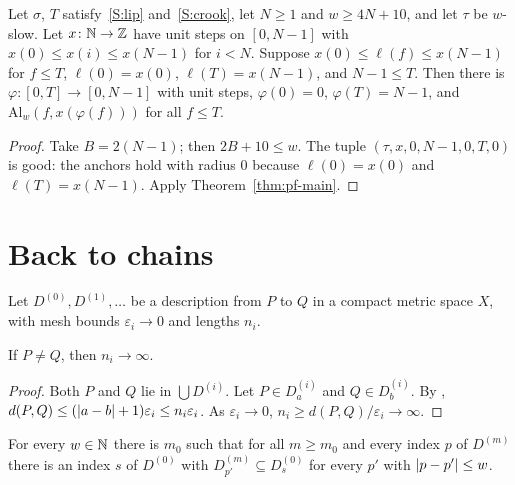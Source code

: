 \begin{theorem}\label{thm:realize}
Let $\sigma$, $T$ satisfy~\ref{S:lip} and~\ref{S:crook}, let $N\ge1$ and $w\ge4N+10$, and let $\tau$ be $w$-slow. Let
$x\colon\mathbb{N}\to\mathbb{Z}$ have unit steps on $[0,N-1]$ with $x(0)\le x(i)\le x(N-1)$ for $i<N$. Suppose $x(0)\le\ell(f)\le x(N-1)$
for $f\le T$, $\ell(0)=x(0)$, $\ell(T)=x(N-1)$, and $N-1\le T$. Then there is $\varphi\colon[0,T]\to[0,N-1]$ with unit
steps, $\varphi(0)=0$, $\varphi(T)=N-1$, and $\mathrm{Al}_w(f,x(\varphi(f)))$ for all $f\le T$.
\end{theorem}

\begin{proof}
Take $B=2(N-1)$; then $2B+10\le w$. The tuple $(\tau,x,0,N-1,0,T,0)$ is good: the anchors hold with radius $0$ because
$\ell(0)=x(0)$ and $\ell(T)=x(N-1)$. Apply Theorem~\ref{thm:pf-main}.
\end{proof}


\section{Back to chains}\label{sec:pf-geometry}

Let $D^{(0)},D^{(1)},\dots$ be a description from $P$ to $Q$ in a compact metric space $X$, with mesh bounds
$\varepsilon_i\to0$ and lengths $n_i$.

\begin{lemma}\label{lem:n-tendsto}
If $P\neq Q$, then $n_i\to\infty$.
\end{lemma}

\begin{proof}
Both $P$ and $Q$ lie in $\bigcup D^{(i)}$. Let $P\in D^{(i)}_a$ and $Q\in D^{(i)}_b$. By ,
$d(P,Q)\le(\left\lvert a-b\right\rvert+1)\varepsilon_i\le n_i\varepsilon_i$. As $\varepsilon_i\to0$, $n_i\ge d(P,Q)/\varepsilon_i\to\infty$.
\end{proof}


\begin{lemma}\label{lem:thick}
For every $w\in\mathbb{N}$ there is $m_0$ such that for all $m\ge m_0$ and every index $p$ of $D^{(m)}$ there is an index $s$ of
$D^{(0)}$ with $D^{(m)}_{p'}\subseteq D^{(0)}_s$ for every $p'$ with $\left\lvert p-p'\right\rvert\le w$.
\end{lemma}

